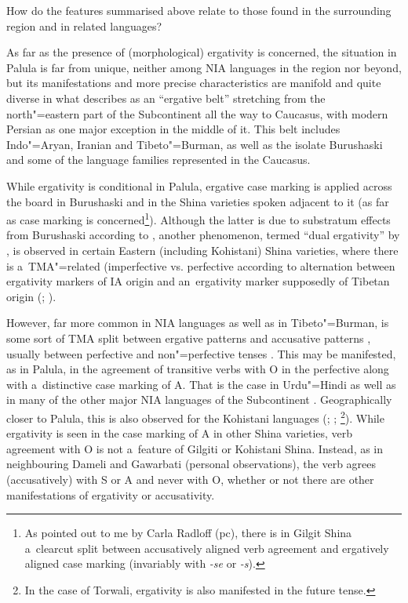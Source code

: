 How do the features summarised above relate to those found in the surrounding region and in related languages?



As far as the presence of (morphological) ergativity is concerned, the situation in Palula is far from unique, neither among NIA languages \citep{deosharma2006} in the region nor beyond, but its manifestations and more precise characteristics are manifold and quite diverse in what \citet[250]{masica2001} describes as an ``ergative belt'' stretching from the north"=eastern part of the Subcontinent all the way to Caucasus, with modern Persian as one major exception in the middle of it. This belt includes Indo"=Aryan, Iranian and Tibeto"=Burman, as well as the isolate Burushaski and some of the language families represented in the Caucasus. 



While ergativity is conditional in Palula, ergative case marking is applied across the board in Burushaski and in the Shina varieties spoken adjacent to it (as far as case marking is concerned\footnote{As pointed out to me by Carla Radloff (pc), there is in Gilgit Shina a~clearcut split between accusatively aligned verb agreement and ergatively aligned case marking (invariably with \textit{-se} or \textit{-s}).}). Although the latter is due to substratum effects from Burushaski according to \citet[248]{masica2001}, another phenomenon, termed ``dual ergativity'' by \citet[213]{hookkoul2004}, is observed in certain Eastern (including Kohistani) Shina varieties, where there is a~TMA"=related (imperfective vs. perfective according to \citealt[51--53]{schmidtkohistani2008}alternation between ergativity markers of IA origin and an~ergativity marker supposedly of Tibetan origin (\citealt[214]{hookkoul2004}; \citealt[211]{bailey1924}). 



However, far more common in NIA languages as well as in Tibeto"=Burman, is some sort of TMA split between ergative patterns and accusative patterns \citep[248]{masica2001}, usually between perfective and non"=perfective tenses \citep[342--343]{masica1991}. This may be manifested, as in Palula, in the agreement of transitive verbs with O in the perfective along with a~distinctive case marking of A. That is the case in Urdu"=Hindi \citep[124]{schmidt1999} as well as in many of the other major NIA languages of the Subcontinent \citep[248]{masica2001}. Geographically closer to Palula, this is also observed for the Kohistani languages (\citealt[136]{baart1999a}; \citealt[34]{hallberghallberg1999}; \citealt[93--95]{lunsford2001}\footnote{In the case of Torwali, ergativity is also manifested in the future tense.}). While ergativity is seen in the case marking of A in other Shina varieties, verb agreement with O is not a~feature of Gilgiti or Kohistani Shina. Instead, as in neighbouring Dameli and Gawarbati (personal observations), the verb agrees (accusatively) with S or A and never with O, whether or not there are other manifestations of ergativity or accusativity.



